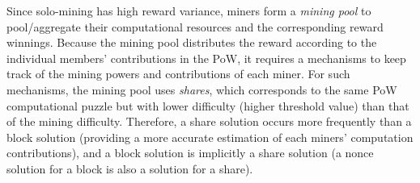 Since solo-mining has high reward variance, 
miners form a \emph{mining pool} to pool/aggregate their computational resources and the corresponding reward winnings. 
Because the mining pool distributes the reward according to the individual members' contributions in the PoW, it requires a mechanisms to keep track of the mining powers and contributions of each miner.
For such mechanisms, the mining pool uses \emph{shares}, which corresponds to the same PoW computational puzzle but with lower difficulty (higher threshold value) than that of the mining difficulty.
Therefore, a share solution occurs more frequently than a block solution (providing a more accurate estimation of each miners' computation contributions), and a block solution is implicitly a share solution (a nonce solution for a block is also a solution for a share). 